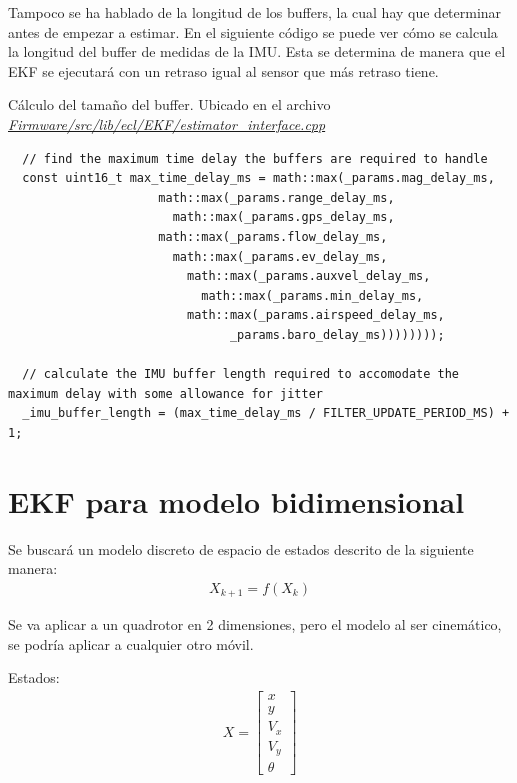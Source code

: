 
Tampoco se ha hablado de la longitud de los buffers, la cual hay que determinar antes de empezar a estimar. En el siguiente código se puede ver cómo se calcula la longitud del buffer de medidas de la IMU. Esta se determina de manera que el EKF se ejecutará con un retraso igual al sensor que más retraso tiene.
\begin{codigo}{Cálculo del tamaño del buffer. Ubicado en el archivo \href{https://github.com/PX4/PX4-ECL/blob/ec934908900b23ee273d1a9f82364b7b38423200/EKF/estimator_interface.cpp\#L513}{\textit{Firmware/src/lib/ecl/EKF/estimator\_interface.cpp}}}
\begin{verbatim}
  // find the maximum time delay the buffers are required to handle
  const uint16_t max_time_delay_ms = math::max(_params.mag_delay_ms,
  				     math::max(_params.range_delay_ms,
  				       math::max(_params.gps_delay_ms,
  					 math::max(_params.flow_delay_ms,
  					   math::max(_params.ev_delay_ms,
  					     math::max(_params.auxvel_delay_ms,
  					       math::max(_params.min_delay_ms,
  						 math::max(_params.airspeed_delay_ms,
  						       _params.baro_delay_ms))))))));
  
  // calculate the IMU buffer length required to accomodate the maximum delay with some allowance for jitter
  _imu_buffer_length = (max_time_delay_ms / FILTER_UPDATE_PERIOD_MS) + 1;
\end{verbatim}
\end{codigo} 


\section{EKF para modelo bidimensional}
Se buscará un modelo discreto de espacio de estados descrito de la siguiente manera:
\begin{align}
X_{k+1} =  f(X_k)
\end{align}

Se va aplicar a un quadrotor en 2 dimensiones, pero el modelo al ser cinemático, se podría aplicar a cualquier otro móvil.

Estados:
\begin{align}
X = 
\begin{bmatrix} 
x \\ y \\ V_x \\ V_y \\ \theta
\end{bmatrix}
\end{align}

